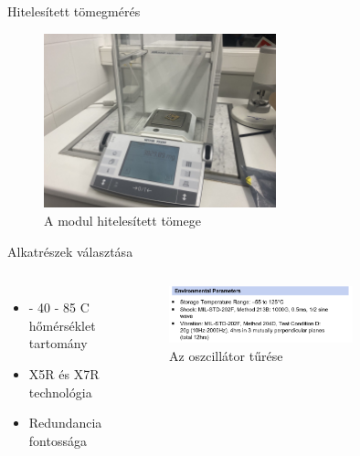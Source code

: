 \documentclass[aspectratio=169,xcolor=dvipsnames]{beamer}
\begin{document}
\begin{frame}{Hitelesített tömegmérés}
	\begin{figure}[h]
		\centering
	\includegraphics[width=0.6\textwidth]{tomeg}
		\caption{A modul hitelesített tömege}
	\end{figure}

\end{frame}






\begin{frame}{Alkatrészek választása}
    \begin{columns}[c] 

       
        \begin{itemize}
            \item{- 40 - 85 \textdegree C hőmérséklet tartomány}
            \item X5R és X7R technológia
	    \item Redundancia fontossága
        

        \end{itemize}

       
		\begin{figure}[h]
		\centering
			
			\includegraphics[width=0.7\textwidth]{oscillator}

		\caption{Az oszcillátor tűrése} 
		\end{figure}

    \end{columns}


\end{frame}
\end{document}
